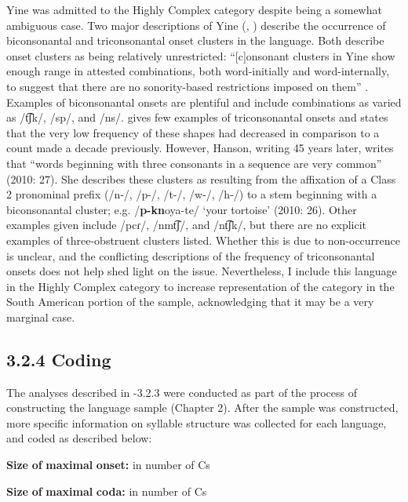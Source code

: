   Yine was admitted to the Highly Complex category despite being a somewhat ambiguous case. Two major descriptions of Yine (\citealt{Hanson2010}, \citealt{Matteson1965}) describe the occurrence of biconsonantal and triconsonantal onset clusters in the language. Both describe onset clusters as being relatively unrestricted: “[c]onsonant clusters in Yine show enough range in attested combinations, both word-initially and word-internally, to suggest that there are no sonority-based restrictions imposed on them” \citep[27]{Hanson2010}. Examples of biconsonantal onsets are plentiful and include combinations as varied as /t͡ʃk/, /sp/, and /ns/. \citet[24]{Matteson1965} gives few examples of triconsonantal onsets and states that the very low frequency of these shapes had decreased in comparison to a count made a decade previously. However, Hanson, writing 45 years later, writes that “words beginning with three consonants in a sequence are very common” (2010: 27). She describes these clusters as resulting from the affixation of a Class 2 pronominal prefix (/n-/, /p-/, /t-/, /w-/, /h-/) to a stem beginning with a biconsonantal cluster; e.g. /\textbf{p-kn}oya-te/ ‘your tortoise’ (2010: 26). Other examples given include /pcɾ/, /nmt͡ʃ/, and /nt͡ʃk/, but there are no explicit examples of three-obstruent clusters listed. Whether this is due to non-occurrence is unclear, and the conflicting descriptions of the frequency of triconsonantal onsets does not help shed light on the issue. Nevertheless, I include this language in the Highly Complex category to increase representation of the category in the South American portion of the sample, acknowledging that it may be a very marginal case.


\subsection{3.2.4 Coding}

  The analyses described in -3.2.3 were conducted as part of the process of constructing the language sample (Chapter 2). After the sample was constructed, more specific information on syllable structure was collected for each language, and coded as described below:



\textbf{Size} \textbf{of} \textbf{maximal} \textbf{onset:} in number of Cs



\textbf{Size} \textbf{of} \textbf{maximal} \textbf{coda:} in number of Cs



